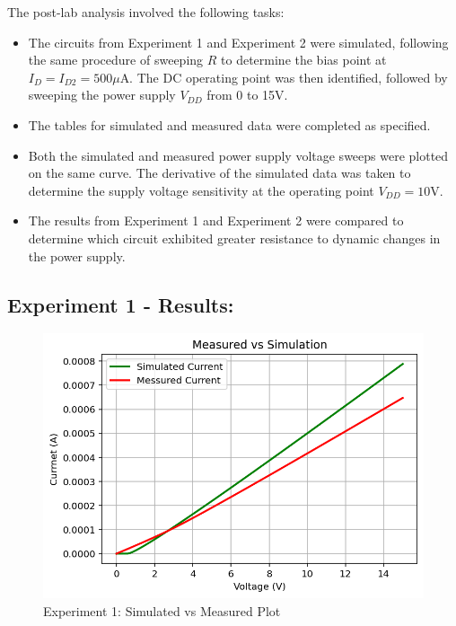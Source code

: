 The post-lab analysis involved the following tasks:

\begin{itemize}

    \item The circuits from Experiment 1 and Experiment 2 were simulated, following the same procedure of sweeping $R$ to determine the bias point at $I_{D} = I_{D2} = 500\mu$A. The DC operating point was then identified, followed by sweeping the power supply $V_{DD}$ from 0 to 15V.
    \item The tables for simulated and measured data were completed as specified.
    \item Both the simulated and measured power supply voltage sweeps were plotted on the same curve. The derivative of the simulated data was taken to determine the supply voltage sensitivity at the operating point $V_{DD} = 10$V.
    \item The results from Experiment 1 and Experiment 2 were compared to determine which circuit exhibited greater resistance to dynamic changes in the power supply.
    
\end{itemize}

\subsection{Experiment 1 - Results:}

\begin{center}
\begin{figure}[H]
	\centering
	\includegraphics[width=0.65\linewidth]{Chapter_2/Lab_02_Exp_01_SIM_VS_MEAS_FINAL.png}
	\caption{Experiment 1: Simulated vs Measured Plot}
	\label{Ch2fig:1}
\end{figure}
\end{center}

